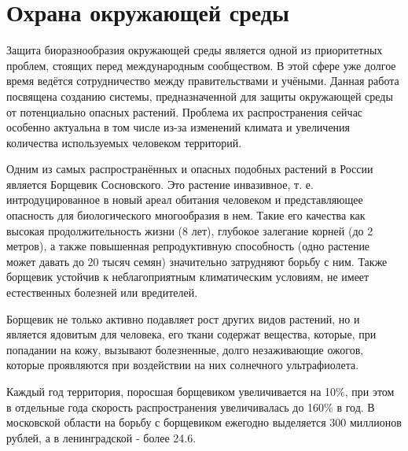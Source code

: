 
\section{Охрана окружающей среды}

\tab
Защита биоразнообразия окружающей среды является одной из приоритетных проблем, стоящих перед международным сообществом.
В этой сфере уже долгое время ведётся сотрудничество между правительствами и учёными\cite{un-biodiv}.
Данная работа посвящена созданию системы, предназначенной для защиты окружающей среды от потенциально опасных растений.
Проблема их распространения сейчас особенно актуальна в том числе из-за изменений климата\cite{poisonous-ivy} и увеличения количества используемых человеком территорий.

\tab
Одним из самых распространённых и опасных подобных растений в России является Борщевик Сосновского\cite{heracleum-desc}.
Это растение инвазивное, т. е. интродуцированное в новый ареал обитания человеком и представляющее опасность для биологического многообразия в нем.
Такие его качества как высокая продолжительность жизни (8 лет), глубокое залегание корней (до 2 метров), а также повышенная репродуктивную способность (одно растение может давать до 20 тысяч семян) значительно затрудняют борьбу с ним.
Также борщевик устойчив к неблагоприятным климатическим условиям, не имеет естественных болезней или вредителей.

\tab
Борщевик не только активно подавляет рост других видов растений, но и является ядовитым для человека, его ткани содержат вещества, которые, при попадании на кожу, вызывают болезненные, долго незаживающие ожогов, которые проявляются при воздействии на них солнечного ультрафиолета.

\tab
Каждый год территория, поросшая борщевиком увеличивается на 10\%\cite{kommersant, er-initiative}, при этом в отдельные года скорость распространения увеличивалась до 160\%\cite{business-online} в год.
В московской области на борьбу с борщевиком ежегодно выделяется 300 миллионов рублей\cite{mos-expenses}, а в ленинградской - более 24.6\cite{len-expenses}.

